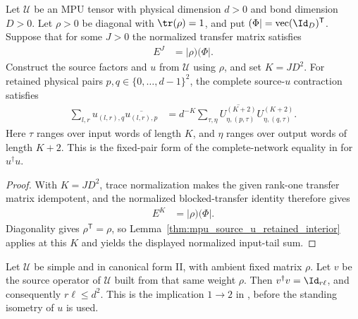 \begin{lemma}
    \label{thm:mpu_source_u_complete_network}
    \leanok
    Let $\mathcal U$ be an MPU tensor with physical dimension $d>0$ and bond
    dimension $D>0$. Let $\rho>0$ be diagonal with $\tr(\rho)=1$, and put
    $(\Phi\rvert=\operatorname{vec}(\Id_D)^{\mathsf T}$. Suppose that for some
    $J>0$ the normalized transfer matrix satisfies
    \begin{align}
        E^J & =\lvert\rho)(\Phi\rvert.
    \end{align}
    Construct the source factors and $u$ from $\mathcal U$ using $\rho$, and set
    $K=JD^2$. For retained physical pairs
    $p,q\in\{0,\ldots,d-1\}^2$, the complete source-$u$ contraction satisfies
    \begin{align}
        \sum_{l,r}u_{(l,r),q}\overline{u_{(l,r),p}}
         & =d^{-K}\sum_{\tau,\eta}
        \overline{U^{(K+2)}_{\eta,(p,\tau)}}
        U^{(K+2)}_{\eta,(q,\tau)}.
    \end{align}
    Here $\tau$ ranges over input words of length $K$, and $\eta$ ranges over
    output words of length $K+2$. This is the fixed-pair form of the
    complete-network equality in \cite[Lemma~III.7]{Cirac2017MPU} for $u^\dagger u$.
\end{lemma}

\begin{proof}\leanok
    With $K=JD^2$, trace normalization makes the given rank-one transfer
    matrix idempotent, and the normalized blocked-transfer identity therefore
    gives
    \begin{align}
        E^K & =\lvert\rho)(\Phi\rvert.
    \end{align}
    Diagonality gives $\rho^{\mathsf T}=\rho$, so
    Lemma~\ref{thm:mpu_source_u_retained_interior} applies at this $K$ and
    yields the displayed normalized input-tail sum.
\end{proof}

\begin{lemma}
    \label{thm:mpu_simple_source_v_isometry}
    \leanok
    Let $\mathcal U$ be simple and in canonical form II, with ambient fixed
    matrix $\rho$. Let $v$ be the source operator
    of $\mathcal U$ built from that same weight $\rho$. Then
    $v^\dagger v=\Id_{r\ell}$, and consequently $r\ell\le d^2$. This is the
    implication $1\to2$ in \cite[proof of Theorem~III.8]{Cirac2017MPU},
    before the standing isometry of $u$ is used.
\end{lemma}

